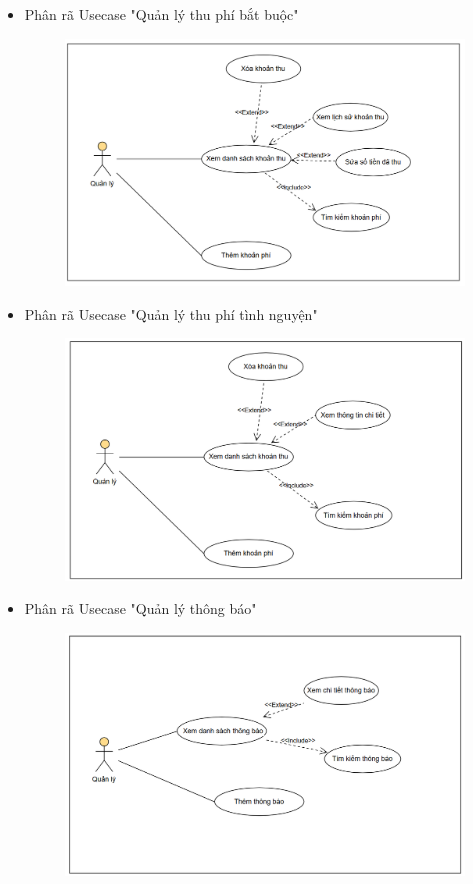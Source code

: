 \documentclass{article}
\begin{document}
\begin{itemize}
    \vspace{1cm}
    \item Phân rã Usecase "Quản lý thu phí bắt buộc"
    \begin{figure}[H]
        \centering
        \includegraphics[width=1\textwidth]{Ảnh chương 2/Khoản thu bắt buộc.png}
    \end{figure}
    \newpage
    \item Phân rã Usecase "Quản lý thu phí tình nguyện"
    \begin{figure}[H]
        \centering
        \includegraphics[width=1\textwidth]{Ảnh chương 2/Khoản thu tình nguyện.png}
    \end{figure}
    \item Phân rã Usecase "Quản lý thông báo"
    \begin{figure}[H]
        \centering
        \includegraphics[width=1\textwidth]{Ảnh chương 2/Thông baso .png}

\end{figure}
\end{itemize}
\end{document}
